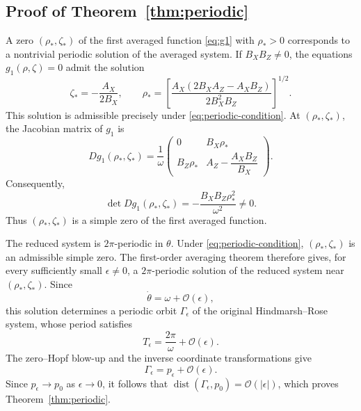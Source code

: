 \documentclass[11pt]{amsart}
\theoremstyle{remark}
\newcommand{\dist}{\operatorname{dist}}
\newcommand{\cO}{\mathcal{O}}
\begin{document}
\subsection{Proof of Theorem~\ref{thm:periodic}}

A zero \((\rho_*,\zeta_*)\) of the first averaged function
\eqref{eq:g1} with \(\rho_*>0\) corresponds to a nontrivial periodic solution
of the averaged system.  If \(B_XB_Z\ne0\), the equations
\(g_1(\rho,\zeta)=0\) admit the solution
\begin{equation}\label{eq:periodic-zero}
 \zeta_*=-\frac{A_X}{2B_X},
 \qquad
 \rho_*=
 \left[
 \frac{A_X(2B_XA_Z-A_XB_Z)}{2B_X^2B_Z}
 \right]^{1/2}.
\end{equation}
This solution is admissible precisely under \eqref{eq:periodic-condition}.
At \((\rho_*,\zeta_*)\), the Jacobian matrix of \(g_1\) is
\begin{equation}\label{eq:Dg1}
Dg_1(\rho_*,\zeta_*)=\frac1\omega
\begin{pmatrix}
0&B_X\rho_*\\
B_Z\rho_*&A_Z-\dfrac{A_XB_Z}{B_X}
\end{pmatrix}.
\end{equation}
Consequently,
\begin{equation}\label{eq:det-Dg1}
 \det Dg_1(\rho_*,\zeta_*)=
 -\frac{B_XB_Z\rho_*^2}{\omega^2}\ne0.
\end{equation}
Thus \((\rho_*,\zeta_*)\) is a simple zero of the first averaged function.

The reduced system is \(2\pi\)-periodic in \(\theta\).  Under
\eqref{eq:periodic-condition}, \((\rho_*,\zeta_*)\) is an admissible simple
zero.  The first-order averaging theorem
\cite[Chapters~2--3]{SandersVerhulstMurdock2007} therefore gives, for every
sufficiently small \(\epsilon\ne0\), a \(2\pi\)-periodic solution of the
reduced system near \((\rho_*,\zeta_*)\).  Since
\[
 \dot{\theta}=\omega+\cO(\epsilon),
\]
this solution determines a periodic orbit \(\Gamma_\epsilon\) of the original
Hindmarsh--Rose system, whose period satisfies
\[
 T_\epsilon=\frac{2\pi}{\omega}+\cO(\epsilon).
\]
The zero--Hopf blow-up and the inverse coordinate transformations give
\[
 \Gamma_\epsilon=p_\epsilon+\cO(\epsilon).
\]
Since \(p_\epsilon\to p_0\) as \(\epsilon\to0\), it follows that
\(\dist(\Gamma_\epsilon,p_0)=\cO(|\epsilon|)\), which proves
Theorem~\ref{thm:periodic}.
\end{document}
